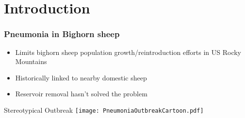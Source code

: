 \documentclass[fleqn,xcolor=table]{beamer}
\begin{document}
{

	\section{Introduction}
\begin{frame}[t]
	\frametitle{\color{darkred}Pneumonia in Bighorn sheep}
\begin{itemize}
\item \small {\color{navy}Limits bighorn sheep population growth/reintroduction efforts in
	US Rocky Mountains }
\item \small {\color{navy}Historically linked to nearby domestic sheep
}
\item \small {\color{navy} Reservoir removal hasn't solved the problem}

\end{itemize}

{\color{darkred} Stereotypical Outbreak}
\newline
%
	\texttt{[image: PneumoniaOutbreakCartoon.pdf]}
%


\end{frame}
}
%
%
\end{document}
